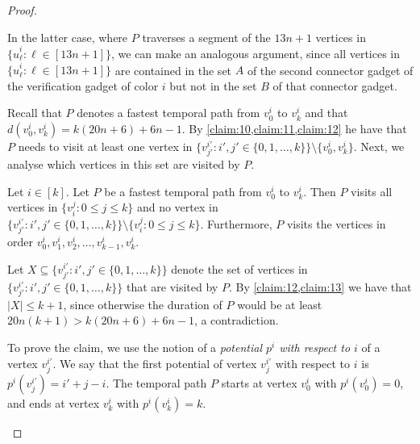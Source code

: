 \documentclass[a4paper,UKenglish,cleveref, autoref, thm-restate]{lipics-v2021}
\begin{document}
\begin{proof}
\begin{claimproof}
    In the latter case, where $P$ traverses a segment of the $13n+1$ vertices in $\{\hat{u}^i_\ell :  \ell\in[13n+1]\}$, we can make an analogous argument, since all vertices in $\{\hat{u}^i_\ell :  \ell\in[13n+1]\}$ are contained in the set $A$ of the second connector gadget of the verification gadget of color $i$ but not in the set $B$ of that connector gadget.
\end{claimproof}

Recall that $P$ denotes a fastest temporal path from $v_0^i$ to $v_k^i$ and that $d(v_0^i,v_k^i)=k(20n+6)+6n-1$. By \cref{claim:10,claim:11,claim:12} he have that $P$ needs to visit at least one vertex in $\{v^{i'}_{j'} :  i',j'\in \{0,1,\ldots,k\}\}\setminus\{v^i_0,v^i_k\}$. Next, we analyse which vertices in this set are visited by $P$.

\begin{claim}\label{claim:14}
Let $i\in[k]$. Let $P$ be a fastest temporal path from $v_0^i$ to $v_k^i$. Then $P$ visits all vertices in $\{v^j_i :  0\le j\le k\}$ and no vertex in $\{v^{i'}_{j'} :  i',j'\in \{0,1,\ldots,k\}\}\setminus\{v^j_i :  0\le j\le k\}$.
Furthermore, $P$ visits the vertices in order $v^i_0, v^i_1, v^i_2, \ldots, v^i_{k-1},v^i_k$.
\end{claim}
\begin{claimproof}
Let $X\subseteq \{v^{i'}_{j'} :  i',j'\in \{0,1,\ldots,k\}\}$ denote the set of vertices in $\{v^{i'}_{j'} :  i',j'\in \{0,1,\ldots,k\}\}$ that are visited by $P$.
By \cref{claim:12,claim:13} we have that $|X|\le k+1$, since otherwise the duration of $P$ would be at least $20n(k+1)>k(20n+6)+6n-1$, a contradiction.

    To prove the claim, we use the notion of a \emph{potential $p^i$ with respect to $i$} of a vertex $v^{i'}_j$.
    We say that the first potential of vertex $v^{i'}_j$ with respect to $i$ is $p^i(v^{i'}_j)=i'+j-i$.
    The temporal path $P$ starts at vertex $v^i_0$ with $p^i(v^i_0)=0$, and ends at vertex $v^i_k$ with $p^i(v^i_k)=k$. 


\end{claimproof}
\end{proof}
\end{document}
